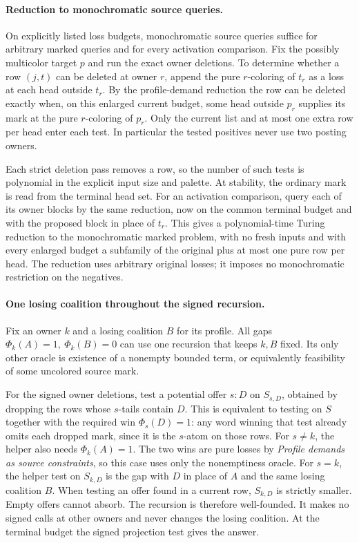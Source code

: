 \paragraph{Reduction to monochromatic source queries.}
On explicitly listed loss budgets, monochromatic
source queries suffice for arbitrary marked queries
and for every activation comparison. Fix the
possibly multicolor target $p$ and run the exact
owner deletions. To determine whether a row $(j,t)$
can be deleted at owner $r$, append the pure
$r$-coloring of $t_r$ as a loss at each head outside
$t_r$. By the profile-demand reduction the row
can be deleted exactly when, on this enlarged
current budget, some head outside $p_r$ supplies
its mark at the pure $r$-coloring of $p_r$.
Only the current list and at most one extra row per
head enter each test. In particular the tested
positives never use two posting owners.

Each strict deletion pass removes a row, so the
number of such tests is polynomial in the explicit
input size and palette. At stability, the ordinary
mark is read from the terminal head set. For an
activation comparison, query each of its owner
blocks by the same reduction, now on the common
terminal budget and with the proposed block in
place of $t_r$. This gives a polynomial-time
Turing reduction to the monochromatic marked
problem, with no fresh inputs and with every
enlarged budget a subfamily of the original plus
at most one pure row per head. The reduction
uses arbitrary original losses; it imposes no
monochromatic restriction on the negatives.

\paragraph{One losing coalition throughout the signed recursion.}
Fix an owner $k$ and a losing coalition $B$ for its
profile. All gaps $\Phi_k(A)=1,\ \Phi_k(B)=0$ can
use one recursion that keeps $k,B$ fixed. Its only
other oracle is existence of a nonempty bounded
term, or equivalently feasibility of some uncolored
source mark.

For the signed owner deletions, test a potential
offer $s:D$ on $S_{s,D}$, obtained by dropping the
rows whose $s$-tails contain $D$. This is equivalent
to testing on $S$ together with the required win
$\Phi_s(D)=1$: any word winning that test already
omits each dropped mark, since it is the $s$-atom
on those rows. For $s\ne k$, the helper also needs
$\Phi_k(A)=1$. The two wins are pure losses by
\emph{Profile demands as source constraints}, so
this case uses only the nonemptiness oracle. For
$s=k$, the helper test on $S_{k,D}$ is the gap
with $D$ in place of $A$ and the same losing
coalition $B$. When testing an offer found in a
current row, $S_{k,D}$ is strictly smaller. Empty
offers cannot absorb. The recursion is therefore
well-founded. It makes no signed calls at other
owners and never changes the losing coalition.
At the terminal budget the signed projection test
gives the answer.

